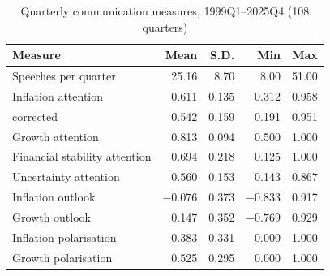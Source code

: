 \begin{table}[htbp]
\centering
\caption{Quarterly communication measures, 1999Q1--2025Q4 (108 quarters)}
\label{tab:summary}
\begin{tabular}{lrrrr}
\toprule
Measure & Mean & S.D. & Min & Max \\
\midrule
Speeches per quarter & 25.16 & 8.70 & 8.00 & 51.00 \\
\addlinespace
Inflation attention & 0.611 & 0.135 & 0.312 & 0.958 \\
\quad corrected & 0.542 & 0.159 & 0.191 & 0.951 \\
Growth attention & 0.813 & 0.094 & 0.500 & 1.000 \\
Financial stability attention & 0.694 & 0.218 & 0.125 & 1.000 \\
Uncertainty attention & 0.560 & 0.153 & 0.143 & 0.867 \\
\addlinespace
Inflation outlook & $-0.076$ & 0.373 & $-0.833$ & 0.917 \\
Growth outlook & 0.147 & 0.352 & $-0.769$ & 0.929 \\
\addlinespace
Inflation polarisation & 0.383 & 0.331 & 0.000 & 1.000 \\
Growth polarisation & 0.525 & 0.295 & 0.000 & 1.000 \\
\bottomrule
\end{tabular}
\end{table}
